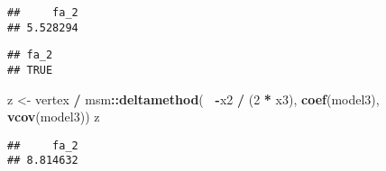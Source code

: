 \documentclass[
]{article}
\newenvironment{Shaded}{\begin{snugshade}}{\end{snugshade}}
\newcommand{\DecValTok}[1]{\textcolor[rgb]{0.00,0.00,0.81}{#1}}
\newcommand{\KeywordTok}[1]{\textcolor[rgb]{0.13,0.29,0.53}{\textbf{#1}}}
\newcommand{\NormalTok}[1]{#1}
\newcommand{\OperatorTok}[1]{\textcolor[rgb]{0.81,0.36,0.00}{\textbf{#1}}}
\newcommand{\StringTok}[1]{\textcolor[rgb]{0.31,0.60,0.02}{#1}}
\begin{document}
\begin{verbatim}
##     fa_2 
## 5.528294
\end{verbatim}

\begin{Shaded}
\end{Shaded}

\begin{verbatim}
## fa_2 
## TRUE
\end{verbatim}

\begin{Shaded}
\begin{Highlighting}[]
\NormalTok{z <-}\StringTok{ }\NormalTok{vertex }\OperatorTok{/}\StringTok{ }\NormalTok{msm}\OperatorTok{::}\KeywordTok{deltamethod}\NormalTok{(}\OperatorTok{~}\StringTok{ }\OperatorTok{-}\NormalTok{x2 }\OperatorTok{/}\StringTok{ }\NormalTok{(}\DecValTok{2} \OperatorTok{*}\StringTok{ }\NormalTok{x3), }\KeywordTok{coef}\NormalTok{(model3), }\KeywordTok{vcov}\NormalTok{(model3))}
\NormalTok{z}
\end{Highlighting}
\end{Shaded}

\begin{verbatim}
##     fa_2 
## 8.814632
\end{verbatim}
\end{document}
